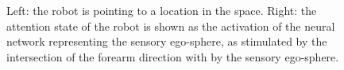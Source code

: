 \documentclass[letterpaper, 10 pt, conference]{ieeeconf}  %
\begin{document}
	
	
	
	
	
	
	
	
	
	
	
	
	
	 
	
	\begin{figure}[h!]
		\begin{center}
		\caption{Left: the robot is pointing to a location in the space. Right: the attention state of the robot is shown as the activation of the neural network representing the sensory ego-sphere, as stimulated by the intersection of the forearm direction with by the sensory ego-sphere.}
		\label{fig:robot_pointing}
		\end{center}
	\end{figure}
\end{document}
